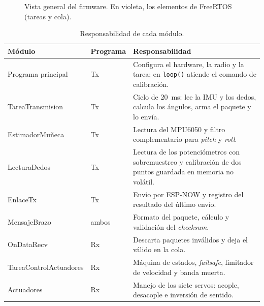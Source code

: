 \begin{figure}[H]
\caption{Vista general del firmware. En violeta, los elementos de FreeRTOS (tareas y cola).}
\label{fig:fw_general}
\end{figure}

\begin{table}[H]
\centering
\small
\begin{tabularx}{\textwidth}{l l X}
\toprule
\textbf{Módulo} & \textbf{Programa} & \textbf{Responsabilidad} \\
\midrule
Programa principal & Tx & Configura el hardware, la radio y la tarea; en \texttt{loop()} atiende el comando de calibración. \\
TareaTransmision & Tx & Ciclo de \SI{20}{ms}: lee la IMU y los dedos, calcula los ángulos, arma el paquete y lo envía. \\
EstimadorMuñeca & Tx & Lectura del MPU6050 y filtro complementario para \emph{pitch} y \emph{roll}. \\
LecturaDedos & Tx & Lectura de los potenciómetros con sobremuestreo y calibración de dos puntos guardada en memoria no volátil. \\
EnlaceTx & Tx & Envío por ESP-NOW y registro del resultado del último envío. \\
MensajeBrazo & ambos & Formato del paquete, cálculo y validación del \emph{checksum}. \\
OnDataRecv & Rx & Descarta paquetes inválidos y deja el válido en la cola. \\
TareaControlActuadores & Rx & Máquina de estados, \emph{failsafe}, limitador de velocidad y banda muerta. \\
Actuadores & Rx & Manejo de los siete servos: acople, desacople e inversión de sentido. \\
\bottomrule
\end{tabularx}
\caption{Responsabilidad de cada módulo.}
\label{tab:fw_modulos}
\end{table}

